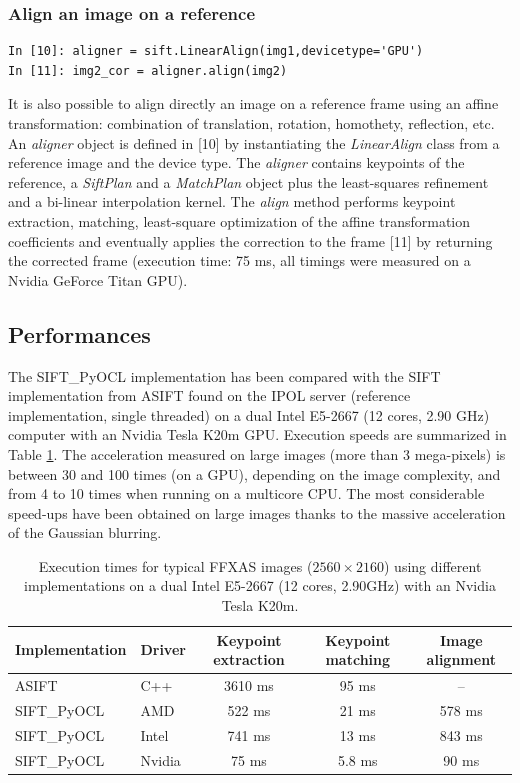\documentclass[preprint]{iucr}
\begin{document}
\subsubsection{Align an image on a reference}
\begin{verbatim}
In [10]: aligner = sift.LinearAlign(img1,devicetype='GPU')
In [11]: img2_cor = aligner.align(img2)
\end{verbatim}
It is also possible to align directly an image on a reference frame using an
affine transformation: combination of translation, rotation, homothety,
reflection, etc.
An \emph{aligner} object is defined in [10] by instantiating the
\emph{LinearAlign} class from a reference image and the device type.
The \emph{aligner} contains keypoints of the
reference, a \emph{SiftPlan} and a \emph{MatchPlan} object plus the
least-squares refinement and a bi-linear interpolation kernel. 
The \emph{align} method performs keypoint extraction, matching, least-square
optimization of the affine transformation coefficients and eventually applies
the correction to the frame [11] by returning the corrected frame (execution
time: 75 ms, all timings were measured on a Nvidia GeForce Titan GPU).

\subsection{Performances}

The SIFT\_PyOCL implementation has been compared with the SIFT
implementation from ASIFT \cite{ASIFT} found on the IPOL server (reference
implementation, single threaded) on a dual Intel E5-2667 (12 cores, 2.90 GHz)
computer with an Nvidia Tesla K20m GPU. Execution speeds are summarized in Table
\ref{bench}.
The acceleration measured on large images (more than 3 mega-pixels) is between
30 and 100 times (on a GPU), depending on the image complexity, and
from 4 to 10 times when running on a multicore CPU.
The most considerable speed-ups have been obtained on large images
thanks to the massive acceleration of the Gaussian blurring.

\begin{table}
\caption{Execution times for typical FFXAS images ($2560 \times 2160$) using
different implementations on a dual Intel E5-2667 (12 cores, 2.90GHz) with an Nvidia Tesla
K20m.}
\label{bench}
\vspace{1mm}
\begin{center}
\begin{tabular}{l l ccc}
Implementation & Driver & Keypoint extraction & Keypoint matching &
Image alignment\\
\hline
ASIFT        &   C++     &   3610 ms  & 95 ms  & --  \\
SIFT\_PyOCL  &   AMD  &   522 ms  &  21 ms&  578 ms \\
SIFT\_PyOCL  &   Intel  &   741 ms  &  13 ms&  843 ms\\
SIFT\_PyOCL  &   Nvidia  &    75 ms  &  5.8 ms & 90 ms\\
\end{tabular}
\end{center}
\end{table}
\end{document}
